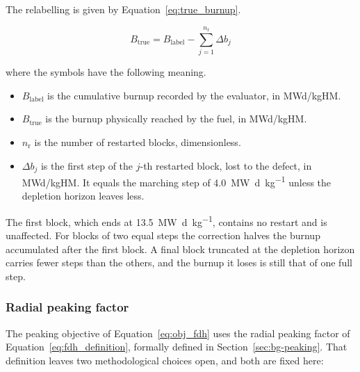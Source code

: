 The relabelling is given by Equation~\eqref{eq:true_burnup}.

\begin{equation}
B_\mathrm{true} = B_\mathrm{label} - \sum_{j=1}^{n_\mathrm{r}} \Delta b_j
\label{eq:true_burnup}
\end{equation}

\noindent where the symbols have the following meaning.

\begin{itemize}
  \item $B_\mathrm{label}$ is the cumulative burnup recorded by the
        evaluator, in MWd/kgHM.

  \item $B_\mathrm{true}$ is the burnup physically reached by the fuel,
        in MWd/kgHM.

  \item $n_\mathrm{r}$ is the number of restarted blocks,
        dimensionless.

  \item $\Delta b_j$ is the first step of the $j$-th restarted block,
        lost to the defect, in MWd/kgHM. It equals the marching step of
        \SI{4.0}{\mega\watt\day\per\kilo\gram} unless the depletion horizon
        leaves less.
\end{itemize}

The first block, which ends at \SI{13.5}{\mega\watt\day\per\kilo\gram},
contains no restart and is unaffected. For blocks of two equal steps the
correction halves the burnup accumulated after the first block. A final block truncated at the
depletion horizon carries fewer steps than the others, and the burnup it
loses is still that of one full step.


\subsubsection{Radial peaking factor}
\label{sec:meth-fdh}

The peaking objective of Equation~\eqref{eq:obj_fdh} uses the radial
peaking factor of Equation~\eqref{eq:fdh_definition}, formally defined
in Section~\ref{sec:bg-peaking}. That definition leaves two
methodological choices open, and both are fixed here:

